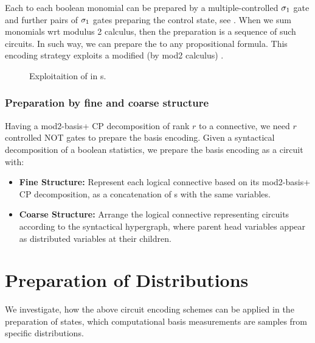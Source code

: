 \documentclass[aps,onecolumn,nofootinbib,pra]{article}
\begin{document}
    Each \computationCircuit{} to each boolean monomial can be prepared by a multiple-controlled $\sigma_1$ gate and further pairs of $\sigma_1$ gates preparing the control state, see . %
    When we sum monomials wrt modulus 2 calculus, then the preparation is a sequence of such circuits.
    In such way, we can prepare the \computationCircuit{} to any propositional formula.
    This encoding strategy exploits a modified (by mod2 calculus) \polynomialSparsity{}.

    \begin{figure}
        \begin{center}
            
        \end{center}
        \caption{
            Exploitaition of \PolynomialSparsity{} in \computationCircuit{}s.
        }\label{fig:qcbencodingPolynomial}
    \end{figure}

    \subsubsection{Preparation by fine and coarse structure}

    Having a mod2-basis+ CP decomposition of rank $r$ to a connective, we need $r$ controlled NOT gates to prepare the basis encoding.
    Given a syntactical decomposition of a boolean statistics, we prepare the basis encoding as a circuit with:
    \begin{itemize}
        \item \textbf{Fine Structure:} Represent each logical connective based on its mod2-basis+ CP decomposition, as a concatenation of \computationCircuit{}s with the same variables.
        \item \textbf{Coarse Structure:} Arrange the logical connective representing circuits according to the syntactical hypergraph, where parent head variables appear as distributed variables at their children.
    \end{itemize}


    \section{Preparation of Distributions}

    We investigate, how the above circuit encoding schemes can be applied in the preparation of states, which computational basis measurements are samples from specific distributions.
\end{document}
